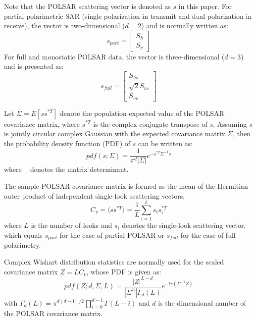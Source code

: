 \documentclass[journal]{IEEEtran}
\begin{document}
Note that the POLSAR scattering vector is denoted as $s$ in this paper.
For partial polarimetric SAR (single polarization in transmit and dual polarization in receive),
  the vector is two-dimensional ($d=2$) and is normally written as: 
\begin{equation}
s_{part}=\begin{bmatrix}
S_h\\ 
S_v
\end{bmatrix}
\end{equation}
For full and monostatic POLSAR data,
  the vector is three-dimensional ($d=3$) and is presented as:
\begin{equation}
s_{full}=\begin{bmatrix}
S_{hh}\\
\sqrt{2}S_{hv}\\
S_{vv}
\end{bmatrix}
\end{equation}

Let $\Sigma=E [ss^{*T}]$ denote the population expected value of the POLSAR covariance matrix,
  where $s^{*T}$ is the complex conjugate transpose of $s$. 
Assuming %
  $s$ is jointly circular complex Gaussian with the expected covariance matrix $\Sigma$,
  then the probability density function (PDF) of $s$ can be written as:
\begin{equation}
  pdf(s;\Sigma)=\frac{1}{\pi^d|\Sigma|} e^{-s^{*T}\Sigma^{-1}s}
\end{equation}
where $||$ denotes the matrix determinant.

The sample POLSAR covariance matrix is formed as the mean of the Hermitian outer product of independent single-look scattering vectors,
\begin{equation}
  C_v = \langle ss^{*T} \rangle = \frac{1}{L} \sum^L_{i=1}s_is_i^{*T}
\end{equation}
where $L$ is the number of looks
  and $s_i$ denotes the single-look scattering vector,
  which equals $s_{part}$ for the case of partial POLSAR or
  $s_{full}$ for the case of full polarimetry.

Complex Wishart distribution statistics are normally used for the scaled covariance matrix
$Z=LC_v$, whose PDF is given as:
\begin{equation}
  pdf(Z;d,\Sigma,L)=\frac{|Z|^{L-d}}{|\Sigma^L|\Gamma_d(L)}e^{-tr(\Sigma^{-1}Z)}
\end{equation}
with $\Gamma_d(L) = \pi^{d(d-1)/2} \prod^{d-1}_{i=0}\Gamma(L-i)$
and $d$ is the dimensional number of the POLSAR covariance matrix.
\end{document}
